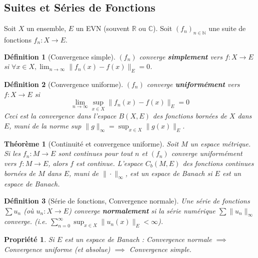 \documentclass[a4paper]{article}
\newcommand{\N}{\mathbb{N}}
\newcommand{\R}{\mathbb{R}}
\newcommand{\C}{\mathbb{C}} %
\newtheorem{theorem}{Théorème}[section]
\newtheorem{definition}{Définition}[section]
\newtheorem{propriete}{Propriété}[section] %
\begin{document}
\subsection{Suites et Séries de Fonctions}
Soit \(X\) un ensemble, \(E\) un EVN (souvent \(\R\) ou \(\C\)). Soit \((f_n)_{n \in \N}\) une suite de fonctions \(f_n: X \to E\).
\begin{definition}[Convergence simple]
    \((f_n)\) converge \textbf{simplement} vers \(f: X \to E\) si \(\forall x \in X, \lim_{n \to \infty} \|f_n(x) - f(x)\|_E = 0\).
\end{definition}
\begin{definition}[Convergence uniforme]
    \((f_n)\) converge \textbf{uniformément} vers \(f: X \to E\) si
    \[ \lim_{n \to \infty} \sup_{x \in X} \|f_n(x) - f(x)\|_E = 0 \]
    Ceci est la convergence dans l'espace \(B(X,E)\) des fonctions bornées de \(X\) dans \(E\), muni de la norme sup \(\|g\|_\infty = \sup_{x \in X} \|g(x)\|_E\).
\end{definition}
\begin{theorem}[Continuité et convergence uniforme]
    Soit \(M\) un espace métrique. Si les \(f_n: M \to E\) sont continues pour tout \(n\) et \((f_n)\) converge uniformément vers \(f: M \to E\), alors \(f\) est continue.
    L'espace \(C_b(M,E)\) des fonctions continues bornées de \(M\) dans \(E\), muni de \(\|\cdot\|_\infty\), est un espace de Banach si \(E\) est un espace de Banach.
\end{theorem}
\begin{definition}[Série de fonctions, Convergence normale]
    Une série de fonctions \(\sum u_n\) (où \(u_n: X \to E\)) converge \textbf{normalement} si la série numérique \(\sum \|u_n\|_\infty\) converge.
    (i.e. \(\sum_{n=0}^\infty \sup_{x \in X} \|u_n(x)\|_E < \infty\)).
\end{definition}
\begin{propriete}
    Si \(E\) est un espace de Banach : Convergence normale \(\implies\) Convergence uniforme (et absolue) \(\implies\) Convergence simple.
\end{propriete}
\end{document}
